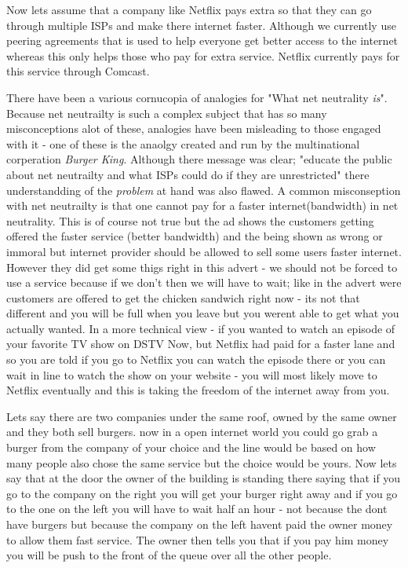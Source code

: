 \documentclass[11pt,a4paper]{newrucsthesis}
\begin{document}
Now lets assume that a company like Netflix pays extra so that they can go through multiple ISPs and make there internet faster. Although we currently use peering agreements that is used to help everyone get better access to the internet whereas this only helps those who pay for extra service. Netflix currently pays for this service through Comcast.


There have been a various cornucopia of analogies for "What net neutrality \textit{is}". Because net neutrailty is such a complex subject that has so many misconceptions alot of these, analogies have been misleading to those engaged with it - one of these is the anaolgy created and run by the multinational corperation \textit{Burger King}. Although there message was clear; "educate the public about net neutrailty and what ISPs could do if they are unrestricted" there understandding of the \textit{problem} at hand was also flawed. A common misconseption with net neutrailty is that one cannot pay for a faster internet(bandwidth) in net neutrality. This is of course not true but the ad shows the customers getting offered the faster service (better bandwidth) and the being shown as wrong or immoral but internet provider should be allowed to sell some users faster internet. However they did get some thigs right in this advert - we should not be forced to use a service because if we don't then we will have to wait; like in the advert were customers are offered to get the chicken sandwich right now - its not that different and you will be full when you leave but you werent able to get what you actually wanted. In a more technical view - if you wanted to watch an episode of your favorite TV show on DSTV Now, but Netflix had paid for a faster lane and so you are told if you go to Netflix you can watch the episode there or you can wait in line to watch the show on your website - you will most likely move to Netflix eventually and this is taking the freedom of the internet away from you. 

Lets say there are two companies under the same roof, owned by the same owner and they both sell burgers. now in a open internet world you could go grab a burger from the company of your choice and the line would be based on how many people also chose the same service but the choice would be yours. Now lets say that at the door the owner of the building is standing there saying that if you go to the company on the right you will get your burger right away and if you go to the one on the left you will have to wait half an hour - not because the dont have burgers but because the company on the left havent paid the owner money to allow them fast service. The owner then tells you that if you pay him money you will be push to the front of the queue over all the other people. 
\end{document}
